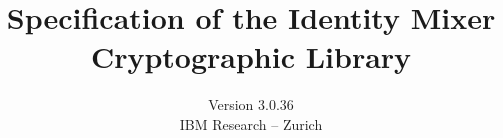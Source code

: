 \documentclass[a4paper]{article}
\theoremstyle{definition}
\begin{document}
\title{Specification of the Identity Mixer Cryptographic Library}

\author{Version 3.0.36\\[5pt]IBM Research -- Zurich
}


\maketitle




\newpage
\tableofcontents
\newpage





%
%

%
%



\newpage



%
\end{document}

